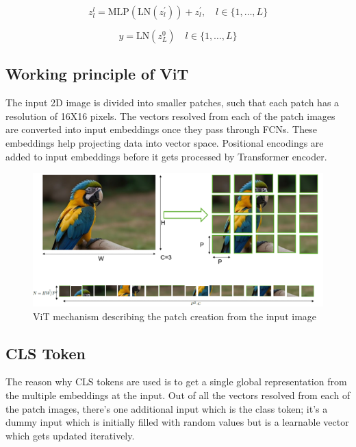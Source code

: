 \documentclass[conference]{IEEEtran}
\begin{document}
\begin{equation}
z_l^{l} = \text{MLP}(\text{LN}(z_{l}^{'})) + z_{l}^{'}, \quad l \in \{1, \ldots, L\}
\end{equation}

\begin{equation}
y = \text{LN}(z_L^{0}) \quad l \in \{1, \ldots, L\}
\end{equation}



\subsection{Working principle of ViT}

The input 2D image is divided into smaller patches, such that each patch has a resolution of 16X16 pixels.
The vectors resolved from each of the patch images are converted into input embeddings once they pass through FCNs. These embeddings help projecting data into vector space.
Positional encodings are added to input embeddings before it gets processed by Transformer encoder.

\begin{figure}[htbp]
\centerline{\includegraphics[width=1\linewidth]{vit_16_16_mechanism.png}}
\caption{ViT mechanism describing the patch creation from the input image}

\end{figure}

\subsection{CLS Token}
The reason why CLS tokens are used is to get a single global representation from the multiple embeddings at the input.
Out of all the vectors resolved from each of the patch images, there's one additional input which is the class token; it's a dummy input which is initially filled with random values but is a learnable vector which gets updated iteratively.
\end{document}
